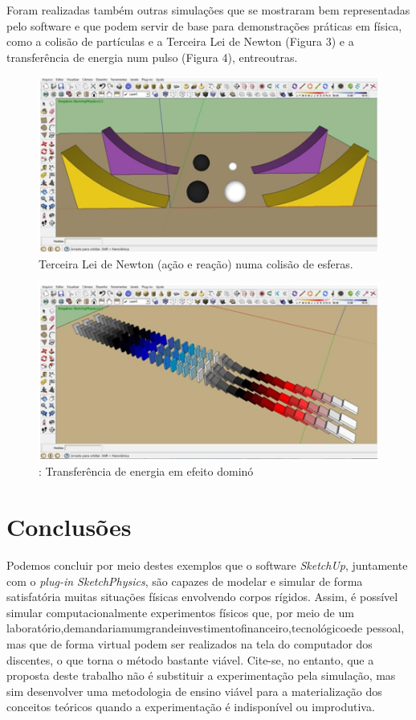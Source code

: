 \documentclass[article,12pt,onesidea,4paper,english,brazil]{abntex2}
\begin{document}
Foram realizadas também outras simulações que se mostraram bem representadas pelo software e que podem servir de base para demonstrações práticas em física, como a colisão de partículas e a Terceira Lei de Newton (Figura
3)	e a transferência de energia num pulso (Figura 4), entreoutras. 
\begin{figure}[h]
	\centering
	\includegraphics[width=0.5\linewidth]{pip-pg70-03}
	\caption{Terceira Lei de Newton (ação e reação) numa colisão de esferas.}
	\label{fig:pip-pg70-03}
\end{figure}

\begin{figure}[h]
	\centering
	\includegraphics[width=0.5\linewidth]{pip-pg70-04}
	\caption{: Transferência de energia em efeito dominó}
	\label{fig:pip-pg70-04}
\end{figure}

	
	\section*{Conclusões}
	
	Podemos concluir por meio destes exemplos que o software \textit{SketchUp}, juntamente com o \textit{  plug-in SketchPhysics}, são capazes de modelar e simular de forma satisfatória muitas situações físicas envolvendo corpos rígidos. Assim, é possível simular computacionalmente experimentos físicos que, por meio de um laboratório,demandariamumgrandeinvestimentofinanceiro,tecnológicoede pessoal, mas que de forma virtual podem ser realizados na tela do computador dos discentes, o que torna o método bastante viável. Cite-se, no entanto, que a proposta deste trabalho não é substituir a experimentação pela simulação, mas sim desenvolver uma metodologia de ensino viável para a materialização dos conceitos teóricos quando a experimentação é indisponível ou improdutiva.
	
\end{document}
